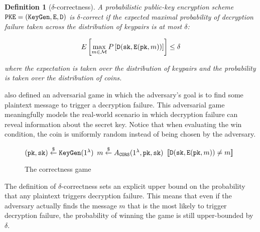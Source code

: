\documentclass{article}
\newtheorem{definition}{Definition}[section]
\begin{document}
\begin{definition}[$\delta$-correctness]\label{def:delta-correctness-pke}
    A probabilistic public-key encryption scheme $\texttt{PKE} = (\texttt{KeyGen}, \texttt{E}, \texttt{D})$ is $\delta$-correct if the expected maximal probability of decryption failure taken across the distribution of keypairs is at most $\delta$:

    \begin{equation*}
        E\left\lbrack\max_{m \in \mathcal{M}} P\left\lbrack
            \texttt{D}(\texttt{sk}, \texttt{E}(\texttt{pk}, m))
        \right\rbrack
        \right\rbrack \leq \delta
    \end{equation*}

    where the expectation is taken over the distribution of keypairs and the probability is taken over the distribution of coins.
\end{definition}

\cite{hofheinz2017modular} also defined an adversarial game in which the adversary's goal is to find some plaintext message to trigger a decryption failure. This adversarial game meaningfully models the real-world scenario in which decryption failure can reveal information about the secret key. Notice that when evaluating the win condition, the coin is uniformly random instead of being chosen by the adversary.

\begin{figure}[H]
    \center

    \begin{minipage}{0.5\textwidth}
        \begin{algorithm}[H]
            \caption{}
            \begin{algorithmic}[1]
                \State $(\texttt{pk}, \texttt{sk}) \stackrel{\$}{\leftarrow} \texttt{KeyGen}(1^\lambda)$
                \State $m \stackrel{\$}{\leftarrow} A_\texttt{CORS}(1^\lambda, \texttt{pk}, \texttt{sk})$
                \State \Return $[\![ \texttt{D}(\texttt{sk}, \texttt{E}(\texttt{pk}, m)) \neq m ]\!]$
            \end{algorithmic}
        \end{algorithm}
    \end{minipage}
    
    \caption{The correctness game }\label{fig:cors-game}
\end{figure}

The definition of $\delta$-correctness sets an explicit upper bound on the probability that any plaintext triggers decryption failure. This means that even if the  adversary actually finds the message $m$ that is the most likely to trigger decryption failure, the probability of winning the  game is still upper-bounded by $\delta$.
\end{document}
